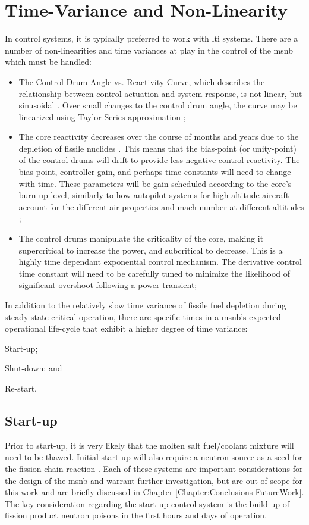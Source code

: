 \section{Time-Variance and Non-Linearity}
In control systems, it is typically preferred to work with \acf{lti} systems. There are a number of non-linearities and time variances at play in the control of the \acs{msnb} which must be handled:

\begin{itemize}
    \item The Control Drum Angle vs. Reactivity Curve, which describes the relationship between control actuation and system response, is not linear, but sinusoidal \cite{PetersonMS}. Over small changes to the control drum angle, the curve may be linearized using Taylor Series approximation \cite[Ch. 2]{Bequette};
    \item The core reactivity decreases over the course of months and years due to the depletion of fissile nuclides \cite[Ch. 7]{Lamarsh}. This means that the bias-point (or unity-point) of the control drums will drift to provide less negative control reactivity. The bias-point, controller gain, and perhaps time constants will need to change with time. These parameters will be gain-scheduled according to the core's burn-up level, similarly to how autopilot systems for high-altitude aircraft account for the different air properties and mach-number at different altitudes \cite{GainSchedule};
    \item The control drums manipulate the criticality of the core, making it supercritical to increase the power, and subcritical to decrease. This is a highly time dependant exponential control mechanism. The derivative control time constant will need to be carefully tuned to minimize the likelihood of significant overshoot following a power transient; 
\end{itemize}


In addition to the relatively slow time variance of fissile fuel depletion during steady-state critical operation, there are specific times in a \acs{msnb}'s expected operational life-cycle that exhibit a higher degree of time variance: 
\begin{enumerate*}
\item Start-up; \item Shut-down; and \item Re-start.
\end{enumerate*}

\subsection{Start-up}
Prior to start-up, it is very likely that the molten salt fuel/coolant mixture will need to be thawed. Initial start-up will also require a neutron source as a seed for the fission chain reaction \cite[Ch. 2]{DH}. Each of these systems are important considerations for the design of the \acs{msnb} and warrant further investigation, but are out of scope for this work and are briefly discussed in Chapter \ref{Chapter:Conclusions-FutureWork}. The key consideration regarding the start-up control system is the build-up of fission product neutron poisons in the first hours and days of operation.

